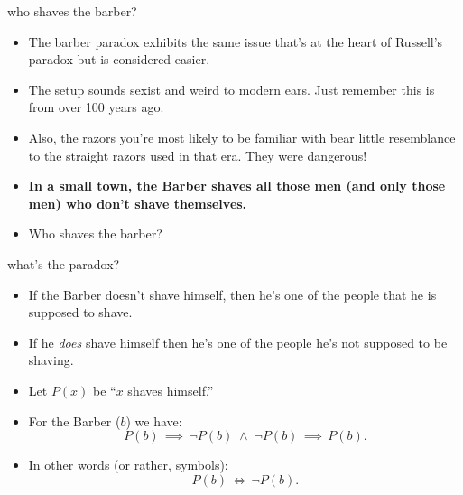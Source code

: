\documentclass[handout,landscape]{beamer}
\begin{document}
\begin{frame}{who shaves the barber?}
\begin{itemize}
\item The barber paradox exhibits the same issue that's at the heart of Russell's paradox but is considered easier. \pause
\item The setup sounds sexist and weird to modern ears.  Just remember this is from over 100 years ago.  \pause
\item Also, the razors you're most likely to be familiar with bear little resemblance to the straight razors used in that era.  They were dangerous! \pause
\item {\bf In a small town, the Barber shaves all those men (and only those men) who don't shave themselves.} \pause
\item Who shaves the barber?
\end{itemize}
\end{frame}

\begin{frame}{what's the paradox?}
\begin{itemize}
\item If the Barber doesn't shave himself, then he's one of the people that he is supposed to shave. \pause
\item If he {\em does} shave himself then he's one of the people he's not supposed to be shaving. \pause
\item Let $P(x)$ be ``$x$ shaves himself.''
\item For the Barber ($b$) we have:
\[ P(b) \, \implies \, \lnot P(b) \; \land \; \lnot P(b) \, \implies \, P(b). \] \pause
\item In other words (or rather, symbols):
\[ P(b) \, \iff \, \lnot P(b). \]
\end{itemize}
\end{frame}
\end{document}
